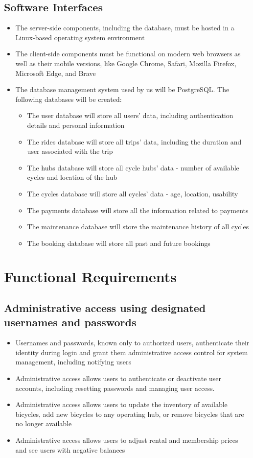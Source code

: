 \documentclass{scrreprt}
\begin{document}
\subsection{Software Interfaces}
\begin{itemize}
    \item The server-side components, including the database, must be hosted in a Linux-based operating system environment
    \item The client-side components must be functional on modern web browsers as well as their mobile versions, like Google Chrome, Safari, Mozilla Firefox, Microsoft Edge, and Brave
    \item The database management system used by us will be PostgreSQL. The following databases will be created:
    \begin{itemize}
        \item The user database will store all users’ data, including authentication details and personal information
        \item The rides database will store all trips’ data, including the duration and user associated with the trip
        \item The hubs database will store all cycle hubs’ data - number of available cycles and location of the hub
        \item The cycles database will store all cycles’ data - age, location, usability
        \item The payments database will store all the information related to payments
        \item The maintenance database will store the maintenance history of all cycles
        \item The booking database will store all past and future bookings
    \end{itemize}
\end{itemize}

\section{Functional Requirements}
\subsection{Administrative access using designated usernames and passwords}
\begin{itemize}
    \item Usernames and passwords, known only to authorized users, authenticate their identity during login and grant them administrative access control for system management, including notifying users
    \item Administrative access allows users to authenticate or deactivate user accounts, including resetting passwords and managing user access.
    \item Administrative access allows users to update the inventory of available bicycles, add new bicycles to any operating hub, or remove bicycles that are no longer available
    \item Administrative access allows users to adjust rental and membership prices and see users with negative balances
\end{itemize}
\end{document}
